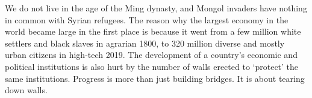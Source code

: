    We do not live in the age of the Ming dynasty, and Mongol invaders have
   nothing in common with Syrian refugees. The reason why the largest
   economy in the world became large in the first place is because it went
   from a few million white settlers and black slaves in agrarian 1800, to
   320 million diverse and mostly urban citizens in high-tech 2019. The
   development of a country's economic and political institutions is also
   hurt by the number of walls erected to `protect' the same institutions.
   Progress is more than just building bridges. It is about tearing down
   walls.

